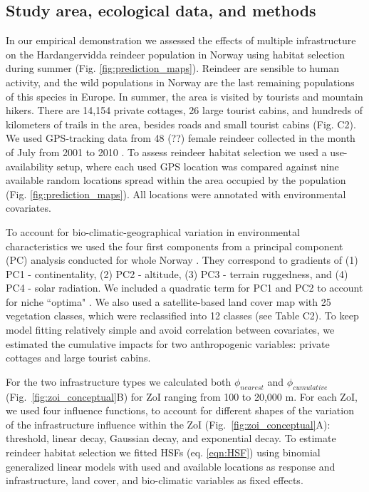 \documentclass[titlepage]{article}
\begin{document}
\subsection{Study area, ecological data, and methods}

In our empirical demonstration we assessed the effects of multiple infrastructure on the Hardangervidda reindeer population in Norway using habitat selection during summer (Fig. \ref{fig:prediction_maps}). Reindeer are sensible to human activity, and the wild populations in Norway are the last remaining populations of this species in Europe. In summer, the area is visited by tourists and mountain hikers. There are 14,154 private cottages, 26 large tourist cabins, and hundreds of kilometers of trails in the area, besides roads and small tourist cabins (Fig. C2). We used GPS-tracking data from 48 (??) female reindeer collected in the month of July from 2001 to 2010 \citep[see][for further details]{panzacchi_searching_2015}. To assess reindeer habitat selection we used a use-availability setup, where each used GPS location was compared against nine available random locations spread within the area occupied by the population (Fig. \ref{fig:prediction_maps}). All locations were annotated with environmental covariates.

To account for bio-climatic-geographical variation in environmental characteristics we used the four first components from a principal component (PC) analysis conducted for whole Norway \citep{bakkestuen_step-less_2008}. They correspond to gradients of (1) PC1 - continentality, (2) PC2 - altitude, (3) PC3 - terrain ruggedness, and (4) PC4 - solar radiation. We included a quadratic term for PC1 and PC2 to account for niche ``optima" \citep[\textit{sensu}][]{panzacchi_searching_2015}. We also used a satellite-based land cover map with 25 vegetation classes, which were reclassified into 12 classes (see Table C2). To keep model fitting relatively simple and avoid correlation between covariates, we estimated the cumulative impacts for two anthropogenic variables: private cottages and large tourist cabins.

For the two infrastructure types we calculated both $\phi_{nearest}$ and $\phi_{cumulative}$ (Fig.~\ref{fig:zoi_conceptual}B) for ZoI ranging from 100 to 20,000 m. For each ZoI, we used four influence functions, to account for different shapes of the variation of the infrastructure influence within the ZoI (Fig.~\ref{fig:zoi_conceptual}A): threshold, linear decay, Gaussian decay, and exponential decay. To estimate reindeer habitat selection we fitted HSFs (eq. \ref{eqn:HSF}) using binomial generalized linear models \citep{fieberg_how_2021} with used and available locations as response and infrastructure, land cover, and bio-climatic variables as fixed effects. 
\end{document}
